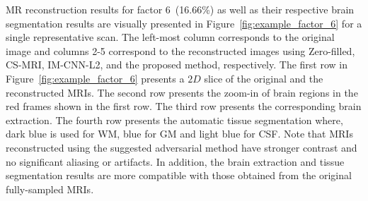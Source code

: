 \documentclass[10pt,journal,compsoc]{IEEEtran}
\begin{document}
MR reconstruction results for factor 6~(16.66\%) as well as their respective brain segmentation results are visually presented in Figure~\ref{fig:example_factor_6} for a single representative scan. The left-most column corresponds to the original image and columns 2-5 correspond to the reconstructed images using Zero-filled, CS-MRI, IM-CNN-L2, and the proposed method, respectively. The first row in Figure~\ref{fig:example_factor_6} presents a $2D$ slice of the original and the reconstructed MRIs. The second row presents the zoom-in of brain regions in the red frames shown in the first row. The third row presents the corresponding brain extraction. The fourth row presents the automatic tissue segmentation where, dark blue is used for WM, blue for GM and light blue for CSF. Note that MRIs reconstructed using the suggested adversarial method have stronger contrast and no significant aliasing or artifacts. In addition, the brain extraction and tissue segmentation results are more compatible with those obtained from the original fully-sampled MRIs. 
\end{document}
